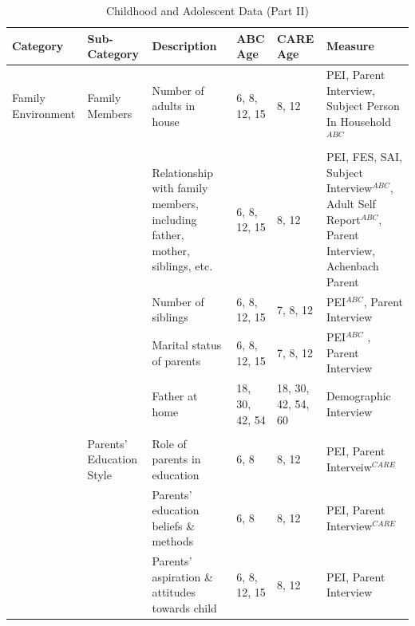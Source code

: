 \documentclass[static]{JJH-Beamer}
\begin{document}
\begin{frame}

\begin{table}[H]
\caption{Childhood and Adolescent Data (Part II)} \label{tab:youthvars_2}
\begin{center}
\begin{tiny}
\begin{tabular}{L{1.2cm} C{1.4cm} C{2.5cm} C{.9cm} C{.8cm} C{2.9cm}}
\toprule
\textbf{Category}	&	\textbf{Sub-Category}	&	\textbf{Description}	&	\textbf{ABC Age}  	&  \textbf{CARE Age}  & 	\textbf{Measure}	\\ \midrule
Family Environment	&	Family Members	&	Number of adults in house	&	6, 8, 12, 15	&	8, 12	&	PEI, Parent Interview, Subject Person In Household$^{ABC}$		\\
	&		&	Relationship with family members, including father, mother, siblings, etc.	&	6, 8, 12, 15	&	8, 12	&	PEI, FES, SAI, Subject Interview$^{ABC}$, Adult Self Report$^{ABC}$, Parent Interview, Achenbach Parent	\\
	&		&	Number of siblings	&	6, 8, 12, 15	&	7, 8, 12	&	PEI$^{ABC}$, Parent Interview	\\
	&		&	Marital status of parents	&	6, 8, 12, 15	&	7, 8, 12	&	PEI$^{ABC}$	, Parent Interview	\\
		&		& Father at home & 18, 30, 42, 54  & 18, 30, 42, 54, 60 & Demographic Interview \\
	&	\\
	&	Parents' Education Style	&	Role of parents in education	&	6, 8	&	8, 12	&	PEI, Parent Interveiw$^{CARE}$	\\
	&		&	Parents' education beliefs \& methods&	6, 8	&	8, 12 	&	PEI, Parent Interview$^{CARE}$		\\
	&		&	Parents' aspiration \& attitudes towards child	&	6, 8, 12, 15	&	8, 12	&	PEI, Parent Interview	\\
\bottomrule
\end{tabular}
\end{tiny}
\end{center}
\end{table}

\end{frame}
\end{document}
